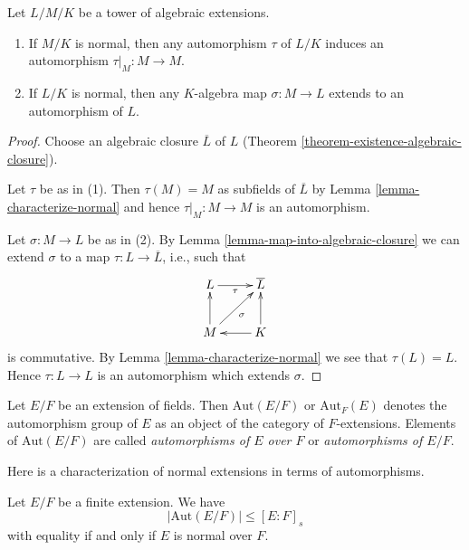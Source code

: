 \begin{lemma}
\label{lemma-lift-maps}
Let $L/M/K$ be a tower of algebraic extensions.
\begin{enumerate}
\item If $M/K$ is normal, then any automorphism $\tau$ of $L/K$
induces an automorphism $\tau|_M : M \to M$.
\item If $L/K$ is normal, then any $K$-algebra map $\sigma : M \to L$
extends to an automorphism of $L$.
\end{enumerate}
\end{lemma}

\begin{proof}
Choose an algebraic closure $\overline{L}$ of $L$
(Theorem \ref{theorem-existence-algebraic-closure}).

\medskip\noindent
Let $\tau$ be as in (1). Then $\tau(M) = M$ as subfields of $\overline{L}$
by Lemma \ref{lemma-characterize-normal} and hence
$\tau|_M : M \to M$ is an automorphism.

\medskip\noindent
Let $\sigma : M \to L$ be as in (2).
By Lemma \ref{lemma-map-into-algebraic-closure}
we can extend $\sigma$ to a map
$\tau : L \to \overline{L}$, i.e., such that
$$
\xymatrix{
L \ar[r]_\tau & \overline{L} \\
M \ar[u] \ar[ru]_\sigma & K \ar[l] \ar[u]
}
$$
is commutative. By Lemma \ref{lemma-characterize-normal} we see that
$\tau(L) = L$. Hence $\tau : L \to L$ is an automorphism which
extends $\sigma$.
\end{proof}

\begin{definition}
\label{definition-automorphisms}
Let $E/F$ be an extension of fields. Then $\text{Aut}(E/F)$ or
$\text{Aut}_F(E)$ denotes the automorphism group of $E$ as an object
of the category of $F$-extensions. Elements of $\text{Aut}(E/F)$
are called {\it automorphisms of $E$ over $F$} or
{\it automorphisms of $E/F$}.
\end{definition}

\noindent
Here is a characterization of normal extensions in terms of automorphisms.

\begin{lemma}
\label{lemma-normal-and-automorphisms}
Let $E/F$ be a finite extension. We have
$$
|\text{Aut}(E/F)| \leq [E : F]_s
$$
with equality if and only if $E$ is normal over $F$.
\end{lemma}

